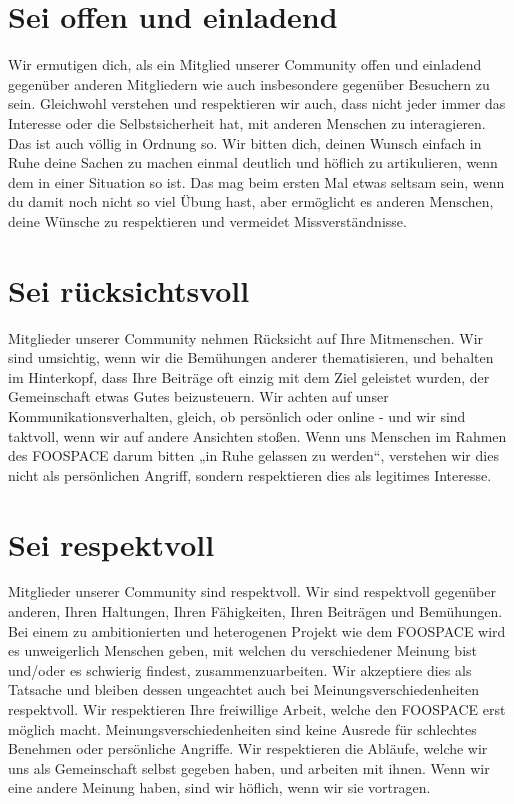 \documentclass[10pt,a4paper]{article}
\newcommand{\qs}[1]{\glqq#1\grqq}
\begin{document}
\section{Sei offen und einladend}
Wir ermutigen dich, als ein Mitglied unserer Community offen und einladend
gegen{\"u}ber anderen Mitgliedern wie auch insbesondere gegen{\"u}ber \qs{Besuchern} zu
sein. Gleichwohl verstehen und respektieren wir auch, dass nicht jeder immer
das Interesse oder die Selbstsicherheit hat, mit anderen Menschen zu
interagieren. Das ist auch v{\"o}llig in Ordnung so. Wir bitten dich, deinen Wunsch
\qs{einfach in Ruhe deine Sachen zu machen} einmal deutlich und h{\"o}flich zu
artikulieren, wenn dem in einer Situation so ist. Das mag beim ersten Mal etwas
seltsam sein, wenn du damit noch nicht so viel {\"U}bung hast, aber erm{\"o}glicht es
anderen Menschen, deine W{\"u}nsche zu respektieren und vermeidet Missverst{\"a}ndnisse.

\section{Sei r{\"u}cksichtsvoll}
Mitglieder unserer Community nehmen R{\"u}cksicht auf Ihre Mitmenschen. Wir sind
umsichtig, wenn wir die Bem{\"u}hungen anderer thematisieren, und behalten im
Hinterkopf, dass Ihre Beitr{\"a}ge oft einzig mit dem Ziel geleistet wurden, der Gemeinschaft etwas Gutes
beizusteuern. Wir achten auf unser Kommunikationsverhalten,
gleich, ob pers{\"o}nlich oder online - und wir sind taktvoll, wenn wir auf andere
Ansichten sto{\ss}en. Wenn uns Menschen im Rahmen des FOOSPACE darum bitten „in Ruhe
gelassen zu werden“, verstehen wir dies nicht als pers{\"o}nlichen Angriff, sondern
respektieren dies als legitimes Interesse.

\section{Sei respektvoll}
Mitglieder unserer Community sind respektvoll. Wir sind respektvoll gegen{\"u}ber
anderen, Ihren Haltungen, Ihren F{\"a}higkeiten, Ihren Beitr{\"a}gen und Bem{\"u}hungen.
Bei einem zu ambitionierten und heterogenen Projekt wie dem FOOSPACE wird es
unweigerlich Menschen geben, mit welchen du verschiedener Meinung bist und/oder
es schwierig findest, zusammenzuarbeiten. Wir akzeptiere dies als Tatsache und
bleiben dessen ungeachtet auch bei Meinungsverschiedenheiten respektvoll. Wir
respektieren Ihre freiwillige Arbeit, welche den FOOSPACE erst m{\"o}glich macht.
Meinungsverschiedenheiten sind keine Ausrede f{\"u}r schlechtes Benehmen oder
pers{\"o}nliche Angriffe. Wir respektieren die Abl{\"a}ufe, welche wir uns als
Gemeinschaft selbst gegeben haben, und arbeiten mit ihnen. Wenn wir eine andere
Meinung haben, sind wir h{\"o}flich, wenn wir sie vortragen.
\end{document}
